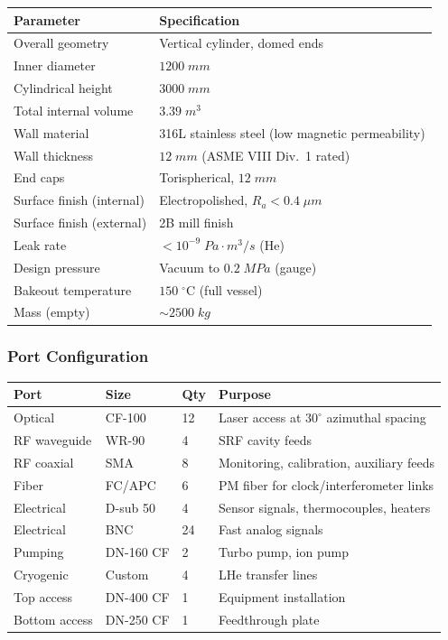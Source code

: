 \documentclass[11pt,a4paper]{article}
\begin{document}
\begin{longtable}{p{}p{}}
\toprule
\textbf{Parameter} & \textbf{Specification} \\
\midrule
\endhead
Overall geometry & Vertical cylinder, domed ends \\
Inner diameter & $1200\;\si{mm}$ \\
Cylindrical height & $3000\;\si{mm}$ \\
Total internal volume & $3.39\;\si{m^3}$ \\
Wall material & 316L stainless steel (low magnetic permeability) \\
Wall thickness & $12\;\si{mm}$ (ASME VIII Div.~1 rated) \\
End caps & Torispherical, $12\;\si{mm}$ \\
Surface finish (internal) & Electropolished, $R_a < 0.4\;\si{\mu m}$ \\
Surface finish (external) & 2B mill finish \\
Leak rate & $< 10^{-9}\;\si{Pa\cdot m^3/s}$ (He) \\
Design pressure & Vacuum to $0.2\;\si{MPa}$ (gauge) \\
Bakeout temperature & $150\;^\circ$C (full vessel) \\
Mass (empty) & $\sim 2500\;\si{kg}$ \\
\bottomrule
\end{longtable}

\subsubsection{Port Configuration}

\begin{longtable}{p{}p{}p{}p{}}
\toprule
\textbf{Port} & \textbf{Size} & \textbf{Qty} & \textbf{Purpose} \\
\midrule
\endhead
Optical & CF-100 & 12 & Laser access at $30^\circ$ azimuthal spacing \\
RF waveguide & WR-90 & 4 & SRF cavity feeds \\
RF coaxial & SMA & 8 & Monitoring, calibration, auxiliary feeds \\
Fiber & FC/APC & 6 & PM fiber for clock/interferometer links \\
Electrical & D-sub 50 & 4 & Sensor signals, thermocouples, heaters \\
Electrical & BNC & 24 & Fast analog signals \\
Pumping & DN-160 CF & 2 & Turbo pump, ion pump \\
Cryogenic & Custom & 4 & LHe transfer lines \\
Top access & DN-400 CF & 1 & Equipment installation \\
Bottom access & DN-250 CF & 1 & Feedthrough plate \\
\bottomrule
\end{longtable}
\end{document}
